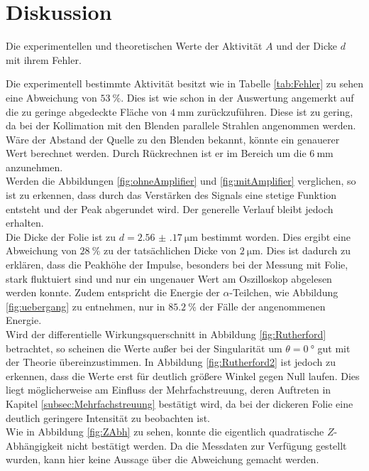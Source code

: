 \section{Diskussion}
\label{sec:Diskussion}

\begin{table}
	\centering
	\caption{Die experimentellen und theoretischen Werte der Aktivität $A$ und der Dicke $d$ mit ihrem Fehler.}
	
	\label{tab:Fehler}
\end{table}

\noindent Die experimentell bestimmte Aktivität besitzt wie in Tabelle \ref{tab:Fehler} zu sehen eine Abweichung von $\SI{53}{\%}$. Dies ist wie schon in der Auswertung angemerkt auf die zu geringe abgedeckte Fläche von $\SI{4}{\milli\metre}$ zurückzuführen. Diese ist zu gering, da bei der Kollimation mit den Blenden parallele Strahlen angenommen werden. Wäre der Abstand der Quelle zu den Blenden bekannt, könnte ein genauerer Wert berechnet werden. Durch Rückrechnen ist er im Bereich um die $\SI{6}{\milli\metre}$ anzunehmen.\\
Werden die Abbildungen \ref{fig:ohneAmplifier} und \ref{fig:mitAmplifier} verglichen, so ist zu erkennen, dass durch das Verstärken des Signals eine stetige Funktion entsteht und der Peak abgerundet wird. Der generelle Verlauf bleibt jedoch erhalten.\\
Die Dicke der Folie ist zu $d=\SI{2.56(17)}{\micro\metre}$ bestimmt worden. Dies ergibt eine Abweichung von $\SI{28}{\%}$ zu der tatsächlichen Dicke von $\SI{2}{\micro\metre}$. Dies ist dadurch zu erklären, dass die Peakhöhe der Impulse, besonders bei der Messung mit Folie, stark fluktuiert sind und nur ein ungenauer Wert am Oszilloskop abgelesen werden konnte. Zudem entspricht die Energie der $\alpha$-Teilchen, wie Abbildung \ref{fig:uebergang} zu entnehmen, nur in $\SI{85,2}{\%}$ der Fälle der angenommenen Energie.\\
Wird der differentielle Wirkungsquerschnitt in Abbildung \ref{fig:Rutherford} betrachtet, so scheinen die Werte außer bei der Singularität um $\theta=\SI{0}{\degree}$ gut mit der Theorie übereinzustimmen. In Abbildung \ref{fig:Rutherford2} ist jedoch zu erkennen, dass die Werte erst für deutlich größere Winkel gegen Null laufen. Dies liegt möglicherweise am Einfluss der Mehrfachstreuung, deren Auftreten in Kapitel \ref{subsec:Mehrfachstreuung} bestätigt wird, da bei der dickeren Folie eine deutlich geringere Intensität zu beobachten ist.\\
Wie in Abbildung \ref{fig:ZAbh} zu sehen, konnte die eigentlich quadratische $Z$-Abhängigkeit nicht bestätigt werden. Da die Messdaten zur Verfügung gestellt wurden, kann hier keine Aussage über die Abweichung gemacht werden.
